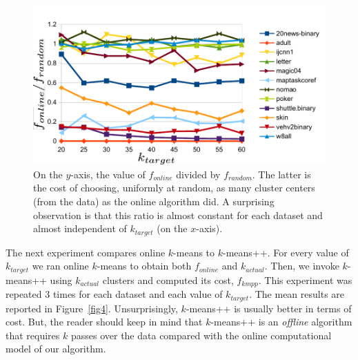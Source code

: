 \documentclass[11pt,twoside]{article}
\begin{document}
\begin{figure}[htbp]
\begin{center}
\includegraphics{figures/plot3.pdf}
\caption{On the $y$-axis, the value of $f_{online}$ divided by $f_{random}$. 
The latter is the cost of choosing, uniformly at random, as many cluster centers (from the data) as the online algorithm did.
A surprising observation is that this ratio is almost constant for each dataset and almost independent of $k_{target}$ (on the $x$-axis).}
\label{fig3}
\end{center}
\end{figure}

The next experiment compares online $k$-means to $k$-means++.
For every value of $k_{target}$ we ran online $k$-means to obtain both $f_{online}$ and $k_{actual}$.
Then, we invoke $k$-means++ using $k_{actual}$ clusters and computed its cost, $f_{kmpp}$.
This experiment was repeated $3$ times for each dataset and each value of $k_{target}$.
The mean results are reported in Figure~\ref{fig4}. 
Unsurprisingly, $k$-means++ is usually better in terms of cost. But, the reader should keep in mind that
$k$-means++ is an \emph{offline} algorithm that requires $k$ passes over the data compared with the online computational model of our algorithm.
\end{document}
